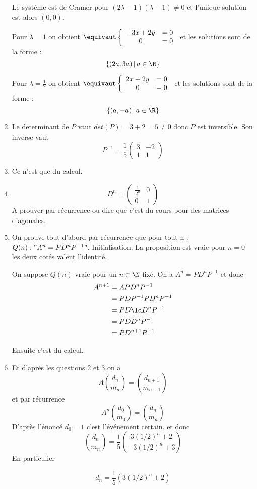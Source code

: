 \begin{correction}
\begin{enumerate}
Le système est de Cramer pour $(2\lambda-1)(\lambda-1)\neq 0$ et l'unique solution est alors $(0,0)$. 

Pour $\lambda=1$ on obtient 
$\equivaut
\left\{  
\begin{array}{cc}
-3 x +2y  &=0\\
0 &=0
\end{array}\right.
$
et les solutions sont de la forme : 
$$\{ (2a,3a ) \, |\, a\in \R\} $$

Pour $\lambda=\frac{1}{2}$ on obtient 
$\equivaut
\left\{  
\begin{array}{cc}
2 x +2y  &=0\\
0 &=0
\end{array}\right.
$
et les solutions sont de la forme : 
$$\{ (a,-a ) \, |\, a\in \R\} $$

\item Le determinant de $P$ vaut $det(P) = 3+2 = 5 \neq 0$ donc $P$ est inversible. 
Son inverse vaut 
$$P^{-1} = \frac{1}{5} \left( 
\begin{array}{cc}
3 & -2 \\
1 & 1
\end{array}
\right)$$

\item Ce n'est que du calcul. 

\item $$D^n =  \left( 
\begin{array}{cc}
\frac{1}{2^n}& 0 \\
0 & 1
\end{array}
\right)$$
A prouver par récurrence ou  dire que c'est du cours pour des matrices diagonales. 
\item 
On prouve tout d'abord par récurrence que pour tout n :
$Q(n) : " A^n = P D^n P^{-1} "$.
Initialisation. La proposition est vraie pour $n=0$ les deux cotés valent l'identité. 

On suppose $Q(n) $ vraie pour un $n \in \N$ fixé. On a 
$A^{n} =   P D^n P^{-1}$ et donc
\begin{align*}
A^{n+1} &=A P D^n P^{-1}\\
&=PDP^{-1} P D^n P^{-1} \\
&= PD \Id D^n P^{-1}  \\
&=PD  D^n P^{-1}\\
&=PD^{n+1} P^{-1}
\end{align*}

Ensuite c'est du calcul. 
\item 
Et d'après les questions 2 et 3 on  a
$$A \binom{d_n}{m_n}= \binom{d_{n+1}}{m_{n+1}}$$
et par récurrence 
$$A^n \binom{d_0}{m_0}= \binom{d_n}{m_n}$$
D'après l'énoncé $d_0= 1$ c'est l'événement certain. 
et donc $$ \binom{d_n}{m_n}= 
\frac{1}{5} \binom{3\left( 1/2\right)^n +2 }{-3\left( 1/2\right)^n +3}$$
En particulier 

$$d_n=\frac{1}{5} (3\left( 1/2\right)^n +2) $$

\end{enumerate}
\end{correction}







